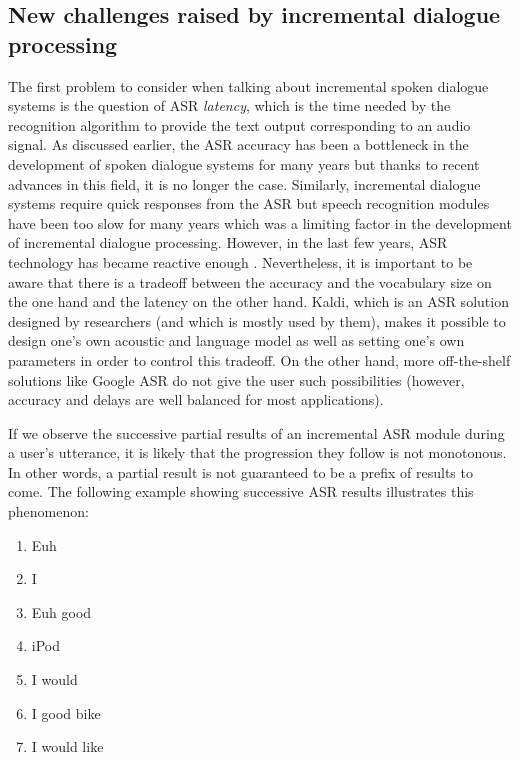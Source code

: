 	\subsection{New challenges raised by incremental dialogue processing}
	\label{soa:challengesincr}
    
		The first problem to consider when talking about incremental spoken dialogue systems is the question of ASR \textit{latency}, which is the time needed by the recognition algorithm to provide the text output corresponding to an audio signal. As discussed earlier, the ASR accuracy has been a bottleneck in the development of spoken dialogue systems for many years but thanks to recent advances in this field, it is no longer the case. Similarly, incremental dialogue systems require quick responses from the ASR but speech recognition modules have been too slow for many years which was a limiting factor in the development of incremental dialogue processing. However, in the last few years, ASR technology has became reactive enough \cite{Breslin2013,Platek2014}. Nevertheless, it is important to be aware that there is a tradeoff between the accuracy and the vocabulary size on the one hand and the latency on the other hand. Kaldi, which is an ASR solution designed by researchers (and which is mostly used by them), makes it possible to design one's own acoustic and language model as well as setting one's own parameters in order to control this tradeoff. On the other hand, more off-the-shelf solutions like Google ASR do not give the user such possibilities (however, accuracy and delays are well balanced for most applications).

		If we observe the successive partial results of an incremental ASR module during a user's utterance, it is likely that the progression they follow is not monotonous. In other words, a partial result is not guaranteed to be a prefix of results to come. The following example showing successive ASR results illustrates this phenomenon:

		\begin{enumerate}
			\item Euh
			\item I
			\item Euh good
			\item iPod
			\item I would
			\item I good bike
			\item I would like
		\end{enumerate}

